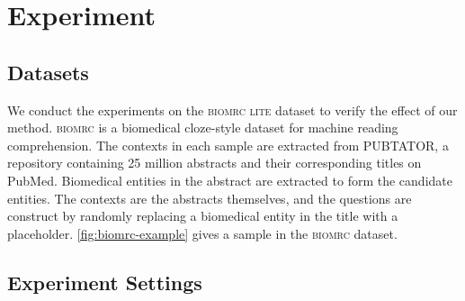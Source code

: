 \documentclass[sigconf, screen]{acmart}
\newcommand{\biomrc}{{\scshape{biomrc}}\xspace}
\newcommand{\biomrclite}{{\scshape{biomrc lite}}\xspace}
\newcommand{\pubmed}{PubMed\xspace}
\begin{document}
\section{Experiment}
\subsection{Datasets}
We conduct the experiments on the \biomrclite dataset \cite{pappasBioMRCDatasetBiomedical2020} to verify the effect of our method. \biomrc is a biomedical cloze-style dataset for machine reading comprehension. The contexts in each sample are extracted from PUBTATOR, a repository containing 25 million abstracts and their corresponding titles on \pubmed. Biomedical entities in the abstract are extracted to form the candidate entities. The contexts are the abstracts themselves, and the questions are construct by randomly replacing a biomedical entity in the title with a placeholder. \cref{fig:biomrc-example} gives a sample in the \biomrc dataset.

\subsection{Experiment Settings}
\end{document}
